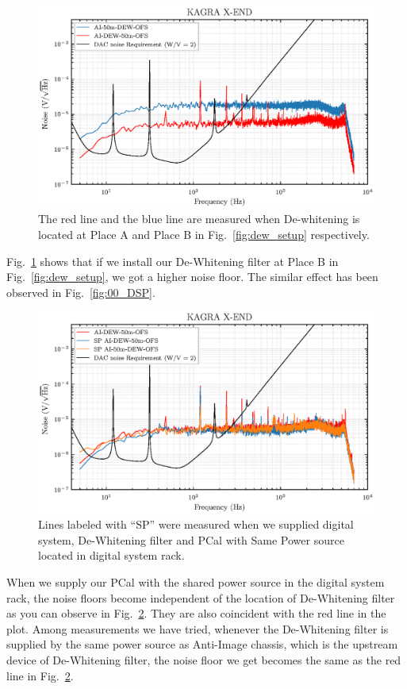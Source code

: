 \begin{figure}[hbt!]
\centering
\includegraphics[width=1\textwidth]{figure/noise/01_AvsB}
\caption[Noise measurement with PCal and different location of the De-whitening]{ The red line and the blue line are measured when De-whitening is located at Place A and Place B in Fig.~\ref{fig:dew_setup} respectively.}
\label{fig:01_AvsB}
\end{figure}

Fig.~\ref{fig:01_AvsB} shows that if we install our De-Whitening filter at Place B in Fig.~\ref{fig:dew_setup}, we got a higher noise floor. The similar effect has been observed in Fig.~\ref{fig:00_DSP}. 

\pagebreak

\begin{figure}[hbt!]
\centering
\includegraphics[width=1\textwidth]{figure/noise/01_SP}
\caption[Noise measurement with PCal and different power source]{ Lines labeled with ``SP'' were measured when we supplied digital system, De-Whitening filter and PCal with Same Power source located in digital system rack. }
\label{fig:01_SP}
\end{figure}

When we supply our PCal with the shared power source in the digital system rack, the noise floors become independent of the location of De-Whitening filter as you can observe in Fig.~\ref{fig:01_SP}. They are also coincident with the red line in the plot. Among measurements we have tried, whenever the De-Whitening filter is supplied by the same power source as Anti-Image chassis, which is the upstream device of De-Whitening filter, the noise floor we get becomes the same as the red line in Fig.~\ref{fig:01_SP}.
